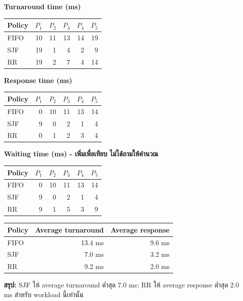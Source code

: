 \newpage{}
\noindent\textbf{Turnaround time (ms)}
\begin{center}\renewcommand{\arraystretch}{1.15}\begin{tabular}{lrrrrr}
Policy & $P_1$ & $P_2$ & $P_3$ & $P_4$ & $P_5$\\\hline
FIFO & 10 & 11 & 13 & 14 & 19\\
SJF & 19 & 1 & 4 & 2 & 9\\
RR & 19 & 2 & 7 & 4 & 14\\
\end{tabular}\end{center}
\noindent\textbf{Response time (ms)}
\begin{center}\renewcommand{\arraystretch}{1.15}\begin{tabular}{lrrrrr}
Policy & $P_1$ & $P_2$ & $P_3$ & $P_4$ & $P_5$\\\hline
FIFO & 0 & 10 & 11 & 13 & 14\\
SJF & 9 & 0 & 2 & 1 & 4\\
RR & 0 & 1 & 2 & 3 & 4\\
\end{tabular}\end{center}
\noindent\textbf{Waiting time (ms) - เพิ่มเพื่อเทียบ ไม่ได้ถามให้คำนวณ}
\begin{center}\renewcommand{\arraystretch}{1.15}\begin{tabular}{lrrrrr}
Policy & $P_1$ & $P_2$ & $P_3$ & $P_4$ & $P_5$\\\hline
FIFO & 0 & 10 & 11 & 13 & 14\\
SJF & 9 & 0 & 2 & 1 & 4\\
RR & 9 & 1 & 5 & 3 & 9\\
\end{tabular}\end{center}
\begin{center}\renewcommand{\arraystretch}{1.15}\begin{tabular}{lrr}
Policy & Average turnaround & Average response\\\hline
FIFO & 13.4 ms & 9.6 ms\\
SJF & 7.0 ms & 3.2 ms\\
RR & 9.2 ms & 2.0 ms\\
\end{tabular}\end{center}
\noindent\textbf{สรุป:} SJF ให้ average turnaround ต่ำสุด 7.0 ms; RR ให้ average response ต่ำสุด 2.0 ms สำหรับ workload นี้เท่านั้น\par\medskip
